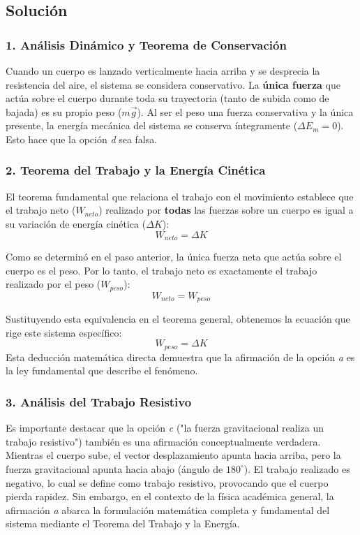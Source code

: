 \documentclass[12pt, a4paper]{article}
\begin{document}
\subsection*{Solución}

\subsubsection*{1. Análisis Dinámico y Teorema de Conservación}
Cuando un cuerpo es lanzado verticalmente hacia arriba y se desprecia la resistencia del aire, el sistema se considera conservativo. La \textbf{única fuerza} que actúa sobre el cuerpo durante toda su trayectoria (tanto de subida como de bajada) es su propio peso ($m\vec{g}$).
Al ser el peso una fuerza conservativa y la única presente, la energía mecánica del sistema se conserva íntegramente ($\Delta E_m = 0$). Esto hace que la opción \textit{d} sea falsa.

\subsubsection*{2. Teorema del Trabajo y la Energía Cinética}
El teorema fundamental que relaciona el trabajo con el movimiento establece que el trabajo neto ($W_{neto}$) realizado por \textbf{todas} las fuerzas sobre un cuerpo es igual a su variación de energía cinética ($\Delta K$):
$$W_{neto} = \Delta K$$

Como se determinó en el paso anterior, la única fuerza neta que actúa sobre el cuerpo es el peso. Por lo tanto, el trabajo neto es exactamente el trabajo realizado por el peso ($W_{peso}$):
$$W_{neto} = W_{peso}$$

Sustituyendo esta equivalencia en el teorema general, obtenemos la ecuación que rige este sistema específico:
$$W_{peso} = \Delta K$$
Esta deducción matemática directa demuestra que la afirmación de la opción \textit{a} es la ley fundamental que describe el fenómeno.

\subsubsection*{3. Análisis del Trabajo Resistivo}
Es importante destacar que la opción \textit{c} ("la fuerza gravitacional realiza un trabajo resistivo") también es una afirmación conceptualmente verdadera. Mientras el cuerpo sube, el vector desplazamiento apunta hacia arriba, pero la fuerza gravitacional apunta hacia abajo (ángulo de $180^\circ$). El trabajo realizado es negativo, lo cual se define como trabajo resistivo, provocando que el cuerpo pierda rapidez.
Sin embargo, en el contexto de la física académica general, la afirmación \textit{a} abarca la formulación matemática completa y fundamental del sistema mediante el Teorema del Trabajo y la Energía.
\end{document}
